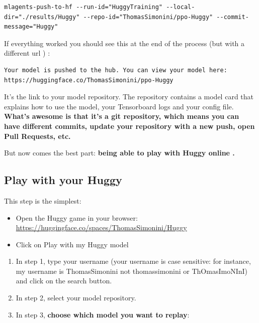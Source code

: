 \documentclass[11pt,a4paper]{article}
\begin{document}
\begin{lstlisting}
mlagents-push-to-hf --run-id="HuggyTraining" --local-dir="./results/Huggy" --repo-id="ThomasSimonini/ppo-Huggy" --commit-message="Huggy"
\end{lstlisting}

If everything worked you should see this at the end of the process (but with a different url ) :

\begin{lstlisting}
Your model is pushed to the hub. You can view your model here: https://huggingface.co/ThomasSimonini/ppo-Huggy
\end{lstlisting}

It's the link to your model repository. The repository contains a model card that explains how to use the model, your Tensorboard logs and your config file. \textbf{What's awesome is that it's a git repository, which means you can have different commits, update your repository with a new push, open Pull Requests, etc.}


But now comes the best part: \textbf{being able to play with Huggy online .}

\subsection{Play with your Huggy}\label{play-with-your-huggy}

This step is the simplest:

\begin{itemize}
\item
  Open the Huggy game in your browser: \url{https://huggingface.co/spaces/ThomasSimonini/Huggy}
\item
  Click on Play with my Huggy model
\end{itemize}


\begin{enumerate}
\def\labelenumi{\arabic{enumi}.}
\item
  In step 1, type your username (your username is case sensitive: for instance, my username is ThomasSimonini not thomassimonini or ThOmasImoNInI) and click on the search button.
\item
  In step 2, select your model repository.
\item
  In step 3, \textbf{choose which model you want to replay}:
\end{enumerate}
\end{document}
